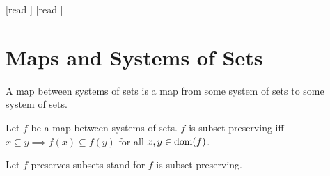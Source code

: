 \documentclass[10pt]{article}
\begin{document}
  \begin{imports}
    \begin{forthel}
      [read ]
      [read ]
    \end{forthel}
  \end{imports}


  \section*{Maps and Systems of Sets}

  \begin{forthel}
    \begin{definition}[id=FOUNDATIONS_10_1394550966845440,printid]
      A map between systems of sets is a map from some system of sets to some system of sets.
    \end{definition}
  \end{forthel}

  \begin{forthel}
    \begin{definition}[id=FOUNDATIONS_10_3290499861446656,printid]
      Let $f$ be a map between systems of sets.
      $f$ is subset preserving iff $x \subseteq y \implies f(x) \subseteq f(y)$ for all $x, y \in \operatorname{dom}(f)$.
    \end{definition}

    Let $f$ preserves subsets stand for $f$ is subset preserving.
  \end{forthel}
\end{document}
